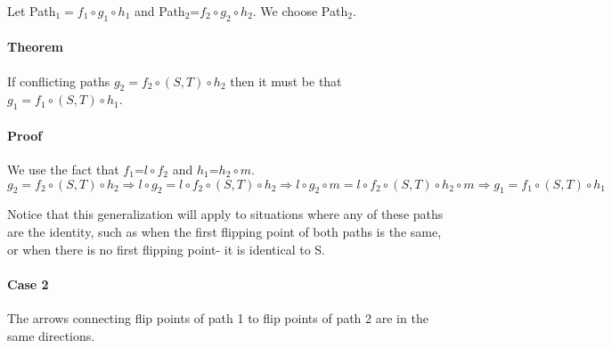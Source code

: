 \documentclass{article}
\begin{document}
Let Path$_1=f_1\circ g_1\circ h_1$ and Path$_2$=$f_2\circ g_2\circ h_2$. We choose Path$_2$.
\paragraph{Theorem} 
If conflicting paths $g_2 = f_2 \circ (S,T) \circ h_2$ then it must be that $g_1 = f_1 \circ (S,T) \circ h_1$.
\paragraph{Proof}
We use the fact that $f_1$=$l\circ f_2$ and $h_1$=$h_2 \circ m$.
\[g_2 = f_2 \circ (S,T) \circ h_2 \Rightarrow l \circ g_2 = l \circ f_2 \circ (S,T) \circ h_2 \Rightarrow l \circ g_2 \circ m = l \circ f_2 \circ (S,T) \circ h_2 \circ m \Rightarrow g_1 = f_1 \circ (S,T) \circ h_1\]


Notice that this generalization will apply to situations where any of these paths are the identity, such as when the first flipping point of both paths is the same, or when there is no first flipping point- it is identical to S.

\paragraph{Case 2} The arrows connecting flip points of path 1 to flip points of path 2 are in the same directions.
\end{document}
